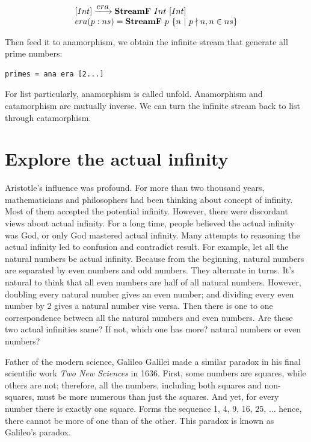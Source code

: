 \documentclass{article}
\begin{document}
\[
\begin{array}{l}
[Int] \arrowto{era} \mathbf{StreamF}\ Int\ [Int] \\
era (p:ns) = \mathbf{StreamF}\ p\ \{ n\ |\ p \nmid n, n \in ns\} \\
\end{array}
\]

Then feed it to anamorphism, we obtain the infinite stream that generate all prime numbers:

\begin{lstlisting}
primes = ana era [2...]
\end{lstlisting}

For list particularly, anamorphism is called unfold. Anamorphism and catamorphism are mutually inverse. We can turn the infinite stream back to list through catamorphism.

\begin{Exercise}
\end{Exercise}

\section{Explore the actual infinity}

Aristotle's influence was profound. For more than two thousand years, mathematicians and philosophers had been thinking about concept of infinity. Most of them accepted the potential infinity. However, there were discordant views about actual infinity. For a long time, people believed the actual infinity was God, or only God mastered actual infinity. Many attempts to reasoning the actual infinity led to confusion and contradict result. For example, let all the natural numbers be actual infinity. Because from the beginning, natural numbers are separated by even numbers and odd numbers. They alternate in turns. It's natural to think that all even numbers are half of all natural numbers. However, doubling every natural number gives an even number; and dividing every even number by 2 gives a natural number vise versa. Then there is one to one correspondence between all the natural numbers and even numbers. Are these two actual infinities same? If not, which one has more? natural numbers or even numbers?

Father of the modern science, Galileo Galilei made a similar paradox in his final scientific work {\em Two New Sciences} in 1636. First, some numbers are squares, while others are not; therefore, all the numbers, including both squares and non-squares, must be more numerous than just the squares. And yet, for every number there is exactly one square. Forms the sequence 1, 4, 9, 16, 25, ... hence, there cannot be more of one than of the other. This paradox is known as Galileo's paradox.
\end{document}
